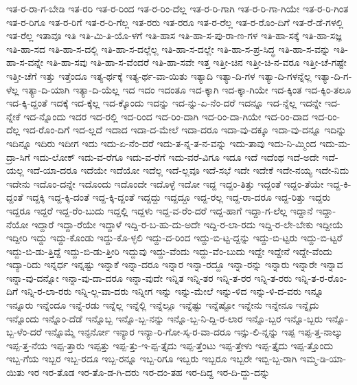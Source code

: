 {ಇತ-ರ-ರಾ-ಗ-ಬೇಡಿ
ಇತ-ರರಿ
ಇತ-ರ-ರಿಂದ
ಇತ-ರ-ರಿಂ-ದೆಲ್ಲ
ಇತ-ರ-ರಿ-ಗಾಗಿ
ಇತ-ರ-ರಿ-ಗಾ-ಗಿಯೇ
ಇತ-ರ-ರಿ-ಗಿಂತ
ಇತ-ರ-ರಿಗೂ
ಇತ-ರ-ರಿಗೆ
ಇತ-ರ-ರಿ-ಗೆಲ್ಲ
ಇತ-ರರು
ಇತ-ರರೂ
ಇತ-ರ-ರೆಲ್ಲ
ಇತ-ರ-ರೊಂ-ದಿಗೆ
ಇತ-ರೆ-ಡೆ-ಗಳಲ್ಲಿ
ಇತ-ರೆಲ್ಲ
ಇತಾವೂ
ಇತಿ
ಇತಿ-ಮಿ-ತಿ-ಯೊ-ಳಗೆ
ಇತಿ-ಹಾಸ
ಇತಿ-ಹಾ-ಸ-ಪು-ರಾ-ಣ-ಗಳ
ಇತಿ-ಹಾ-ಸಕ್ಕೆ
ಇತಿ-ಹಾ-ಸಜ್ಞ
ಇತಿ-ಹಾ-ಸದ
ಇತಿ-ಹಾ-ಸ-ದಲ್ಲಿ
ಇತಿ-ಹಾ-ಸ-ದಲ್ಲೆಲ್ಲ
ಇತಿ-ಹಾ-ಸ-ದಲ್ಲೇ
ಇತಿ-ಹಾ-ಸ-ಪ್ರ-ಸಿದ್ಧ
ಇತಿ-ಹಾ-ಸ-ವನ್ನು
ಇತಿ-ಹಾ-ಸ-ವನ್ನೇ
ಇತಿ-ಹಾ-ಸವು
ಇತಿ-ಹಾ-ಸ-ವೆಂದರೆ
ಇತಿ-ಹಾ-ಸವೇ
ಇತ್ತ
ಇತ್ತೀ-ಚಿನ
ಇತ್ತೀ-ಚಿ-ನ-ವರೂ
ಇತ್ತೀ-ಚೆ-ಗಷ್ಟೇ
ಇತ್ತೀ-ಚೆಗೆ
ಇತ್ತು
ಇತ್ತೆಂದೂ
ಇತ್ಯ-ರ್ಥಕ್ಕೆ
ಇತ್ಯ-ರ್ಥ-ವಾ-ಯಿತು
ಇತ್ಯಾದಿ
ಇತ್ಯಾ-ದಿ-ಗಳ
ಇತ್ಯಾ-ದಿ-ಗಳನ್ನೆಲ್ಲ
ಇತ್ಯಾ-ದಿ-ಗ-ಳೆಲ್ಲ
ಇತ್ಯಾ-ದಿ-ಯಾಗಿ
ಇತ್ಯಾ-ದಿ-ಯೆಲ್ಲ
ಇದ
ಇದಂ
ಇದಂತೂ
ಇದ-ಕ್ಕಾಗಿ
ಇದ-ಕ್ಕಾ-ಗಿಯೇ
ಇದ-ಕ್ಕಿಂತ
ಇದ-ಕ್ಕಿಂ-ತಲೂ
ಇದ-ಕ್ಕಿ-ದ್ದಂತೆ
ಇದಕ್ಕೆ
ಇದ-ಕ್ಕೆಲ್ಲ
ಇದ-ಕ್ಕೊಂದು
ಇದನ್ನು
ಇದ-ನ್ನು-ಏ-ನೆಂ-ದರೆ
ಇದನ್ನೂ
ಇದ-ನ್ನೆಲ್ಲ
ಇದನ್ನೇ
ಇದ-ನ್ನೇಕೆ
ಇದ-ನ್ನೊಂದು
ಇದರ
ಇದ-ರಲ್ಲಿ
ಇದ-ರಿಂದ
ಇದ-ರಿಂ-ದಾಗಿ
ಇದ-ರಿಂ-ದಾ-ಗಿಯೇ
ಇದ-ರಿಂ-ದಾದ
ಇದ-ರಿಂ-ದೆಲ್ಲ
ಇದ-ರೊಂ-ದಿಗೆ
ಇದ-ಲ್ಲದೆ
ಇದಾದ
ಇದಾ-ದ-ಮೇಲೆ
ಇದಾ-ದರೂ
ಇದಾ-ವು-ದಕ್ಕೂ
ಇದಾ-ವು-ದನ್ನೂ
ಇದಿನ್ನು
ಇದಿನ್ನೂ
ಇದಿರು
ಇದೀಗ
ಇದು
ಇದು-ಏ-ನೆಂ-ದರೆ
ಇದು-ತ-ನ್ನ-ತ-ನ-ವನ್ನು
ಇದು-ತಾವು
ಇದು-ನಿ-ಮ್ಮಿಂದ
ಇದು-ಮ-ದ್ರಾ-ಸಿಗೆ
ಇದು-ಲೋಕ್
ಇದು-ವ-ರೆಗೂ
ಇದು-ವ-ರೆಗೆ
ಇದು-ವರೆ-ವಿಗೂ
ಇದೂ
ಇದೆ
ಇದೆಂಥ
ಇದೆ-ಅದೇ
ಇದೆ-ಯಲ್ಲ
ಇದೆ-ಯಾ-ದರೂ
ಇದೆಯೇ
ಇದೆಯೋ
ಇದೆಲ್ಲ
ಇದೆ-ಲ್ಲವೂ
ಇದೆ-ಸಭೆ
ಇದೇ
ಇದೇಕೆ
ಇದೇ-ನಯ್ಯ
ಇದೇ-ನಿದು
ಇದೇನು
ಇದೊಂ-ದನ್ನೇ
ಇದೊಂದು
ಇದೊಂದೇ
ಇದೊಳ್ಳೆ
ಇದೋ
ಇದ್ದ
ಇದ್ದಂ-ತಿತ್ತು
ಇದ್ದಂತೆ
ಇದ್ದಂ-ತೆಯೇ
ಇದ್ದ-ಕಿ-ದ್ದಂತೆ
ಇದ್ದಕ್ಕಿ
ಇದ್ದ-ಕ್ಕಿ-ದಂತೆ
ಇದ್ದ-ಕ್ಕಿ-ದ್ದಂತೆ
ಇದ್ದದ್ದು
ಇದ್ದದ್ದೂ
ಇದ್ದ-ರಲ್ಲ
ಇದ್ದ-ರಾ-ದರೂ
ಇದ್ದ-ರಿತ್ತು
ಇದ್ದರು
ಇದ್ದರೂ
ಇದ್ದರೆ
ಇದ್ದ-ರೆಂ-ಬುದು
ಇದ್ದಲ್ಲಿ
ಇದ್ದಳು
ಇದ್ದ-ವ-ರೆಂ-ದರೆ
ಇದ್ದ-ಹಾಗೆ
ಇದ್ದಾ-ಗ-ಲೆಲ್ಲ
ಇದ್ದಾನೆ
ಇದ್ದಾ-ನೆಯೋ
ಇದ್ದಾರೆ
ಇದ್ದಾ-ರೆಯೇ
ಇದ್ದಾಳೆ
ಇದ್ದಿ-ರ-ಬ-ಹು-ದು-ಅದೇ
ಇದ್ದಿ-ರ-ಲಾ-ರದು
ಇದ್ದಿ-ರ-ಲೇ-ಬೇಕು
ಇದ್ದೀಯೆ
ಇದ್ದೀರಿ
ಇದ್ದು
ಇದ್ದು-ಕೊಂಡು
ಇದ್ದು-ಕೊ-ಳ್ಳಲಿ
ಇದ್ದು-ದ-ರಿಂದ
ಇದ್ದು-ಬಿ-ಟ್ಟ-ದ್ದನ್ನು
ಇದ್ದು-ಬಿ-ಟ್ಟರು
ಇದ್ದು-ಬಿ-ಟ್ಟರೆ
ಇದ್ದು-ಬಿ-ಡು-ತ್ತಿದ್ದೆ
ಇದ್ದು-ಬಿ-ಡು-ತ್ತೀರಿ
ಇದ್ದುವು
ಇದ್ದು-ವೆಂದು
ಇದ್ದು-ವೆಂ-ಬುದು
ಇದ್ದೇ
ಇದ್ದೇನೆ
ಇದ್ದೇ-ವೆಂದು
ಇದ್ಯಾ-ರಿದು
ಇನ್ನರ್ಧ
ಇನ್ನಷ್ಟು
ಇನ್ನಾಕೆ
ಇನ್ನಾ-ದರೂ
ಇನ್ನಾರ
ಇನ್ನಾ-ರದ್ದೂ
ಇನ್ನಾ-ರನ್ನು
ಇನ್ನಾರು
ಇನ್ನಾರೇ
ಇನ್ನಾವ
ಇನ್ನಾ-ವು-ದನ್ನೋ
ಇನ್ನಾ-ವು-ದಾ-ದರೂ
ಇನ್ನಾ-ವುದೇ
ಇನ್ನಿತ
ಇನ್ನಿ-ತರ
ಇನ್ನಿ-ತ-ರರ
ಇನ್ನಿ-ತ-ರರು
ಇನ್ನಿ-ತ-ರ-ರೊಂ-ದಿಗೆ
ಇನ್ನಿ-ರ-ಲಾ-ರರು
ಇನ್ನಿ-ಲ್ಲ-ವಾ-ದರು
ಇನ್ನೀಗ
ಇನ್ನು
ಇನ್ನು-ಮೇಲೆ
ಇನ್ನು-ಳಿದ
ಇನ್ನು-ಳಿ-ದ-ವರು
ಇನ್ನೂ
ಇನ್ನೂರು
ಇನ್ನೆಂದೂ
ಇನ್ನೆ-ರಡು
ಇನ್ನೆಲ್ಲ
ಇನ್ನೆಲ್ಲಿ
ಇನ್ನೆಲ್ಲೂ
ಇನ್ನೆಷ್ಟು
ಇನ್ನೆಷ್ಟೋ
ಇನ್ನೇನು
ಇನ್ನೇನೂ
ಇನ್ನೈದು
ಇನ್ನೊಂದು
ಇನ್ನೊಂ-ದೆಡೆ
ಇನ್ನೊಬ್ಬ
ಇನ್ನೊ-ಬ್ಬ-ನನ್ನು
ಇನ್ನೊ-ಬ್ಬ-ನಿ-ದ್ದಿ-ರ-ಲಾರ
ಇನ್ನೊ-ಬ್ಬರ
ಇನ್ನೊ-ಬ್ಬರು
ಇನ್ನೊ-ಬ್ಬ-ಳೆಂ-ದರೆ
ಇನ್ನೊಮ್ಮೆ
ಇನ್ಫರ್ನೋ
ಇನ್ಯಾರ
ಇನ್ಯಾ-ರಿ-ಗೋ-ಸ್ಕ-ರ-ವಾ-ದರೂ
ಇನ್ಸು-ಲಿ-ನ್ನನ್ನು
ಇಪ್ಪ
ಇಪ್ಪ-ತ್ತ-ನಾಲ್ಕು
ಇಪ್ಪ-ತ್ತ-ನೆಯ
ಇಪ್ಪ-ತ್ತಾರು
ಇಪ್ಪತ್ತು
ಇಪ್ಪ-ತ್ತು-ಇ-ಪ್ಪ-ತ್ತೈದು
ಇಪ್ಪ-ತ್ತೆಂಟು
ಇಪ್ಪ-ತ್ತೇಳು
ಇಪ್ಪ-ತ್ತೈದು
ಇಪ್ಪ-ತ್ತೊಂದು
ಇಬ್ಬ-ಗೆಯ
ಇಬ್ಬರ
ಇಬ್ಬ-ರದೂ
ಇಬ್ಬ-ರನ್ನೂ
ಇಬ್ಬ-ರಿಗೂ
ಇಬ್ಬರು
ಇಬ್ಬರೂ
ಇಬ್ಬರೇ
ಇಬ್ಬಿ-ಬ್ಬ-ರಾಗಿ
ಇಮ್ಮ-ಡಿ-ಯಾ-ಯಿತು
ಇರ
ಇರ-ತೊಡ
ಇರ-ತೊ-ಡ-ಗಿ-ದರು
ಇರ-ದಂ-ತಹ
ಇರ-ದಿದ್ದ
ಇರ-ದಿ-ದ್ದು-ದನ್ನು
}
